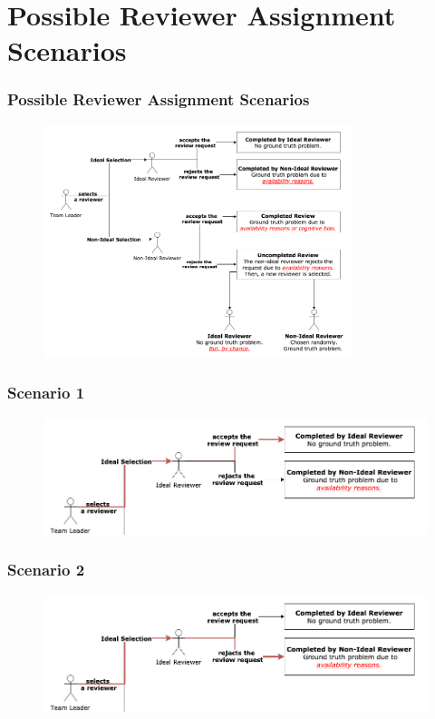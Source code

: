 \documentclass{beamer}
\begin{document}
\section{Possible Reviewer Assignment Scenarios}
\begin{frame}
\frametitle{\large Possible Reviewer Assignment Scenarios}
      \begin{figure}
      \includegraphics[width=0.8\textwidth]{img/scenarios_all.png}
      \end{figure}
\end{frame}
\begin{frame}
\frametitle{\large Scenario 1}
      \begin{figure}
      \includegraphics[width=1.05\textwidth]{img/scenarios_1.png}
      \end{figure}
\end{frame}
\begin{frame}
\frametitle{\large Scenario 2}
      \begin{figure}
      \includegraphics[width=1.05\textwidth]{img/scenarios_2.png}
      \end{figure}
\end{frame}
\end{document}

